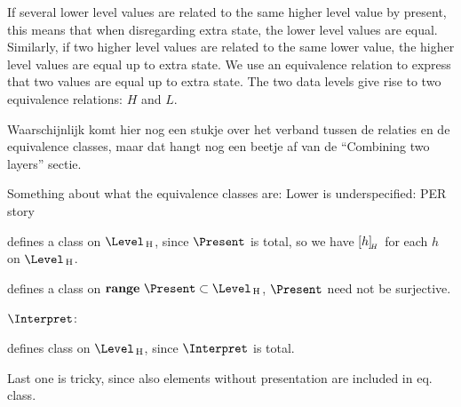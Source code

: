 If several lower level values are related to the same higher level value by present, this means that when disregarding extra state, the lower level values are equal. Similarly, if two higher level values are related to the same lower value, the higher level values are equal up to extra state. We use an equivalence relation to express that two values are equal up to extra state. The two data levels give rise to two equivalence relations: $H$ and $L$.





\toHere
Waarschijnlijk komt hier nog een stukje over het verband tussen de relaties en de equivalence classes, maar dat hangt nog een beetje af van de ``Combining two layers'' sectie.
\fromHere


\bc
\textdownarrow\textdownarrow\textdownarrow\textdownarrow

Something about what the equivalence classes are: Lower is underspecified: 
PER story


defines a class on $\Level\H$, since $\Present$ is total, so we have $[{h}]_{{\!_{H}}}$ for each $h$ on $\Level\H$.

defines a class on ${\bf range}~\Present \subset \Level\H$, $\Present$ need not be surjective.

$\Interpret$:


defines class on $\Level\H$, since $\Interpret$ is total.

Last one is tricky, since also elements without presentation are included in eq. class.

